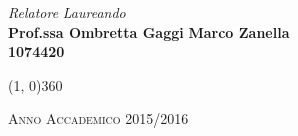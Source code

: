 \begin{titlepage}
\vfill
\begin{normalsize}
\begin{flushleft}
  \hspace{30pt} \textit{Relatore} \hspace{200pt} \textit{Laureando}\\
  \vspace{5pt}
  \hspace{30pt} \large{\textbf{Prof.ssa Ombretta Gaggi}} \hspace{70pt} \large{\textbf{Marco Zanella}}\\
  \hspace{284pt} \large{\textbf{1074420}}
  \vspace{10pt}
\end{flushleft}
\end{normalsize}

\vfill
\begin{center}
\hspace{-0.2cm}
\line(1, 0){360}

\textsc{Anno Accademico 2015/2016}
\end{center}
\end{titlepage}
